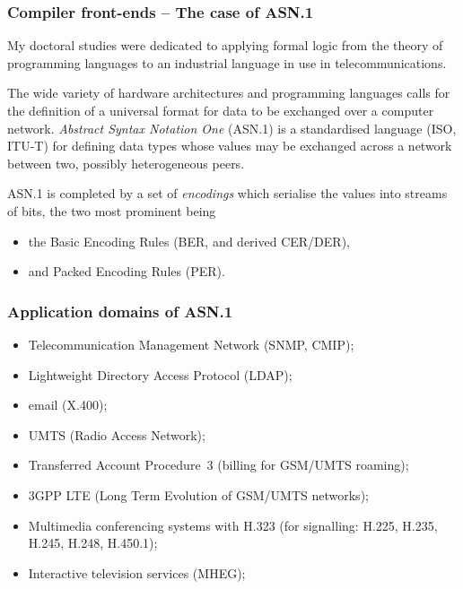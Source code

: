 \documentclass[compress,dvips,xcolor={dvipsnames},t]{beamer}
\newcommand\ASN{\textsf{ASN.1}\xspace}
\begin{document}

\begin{frame}
  \frametitle{Compiler front-ends -- The case of \ASN}

My doctoral studies were dedicated to applying formal logic from the
theory of programming languages to an industrial language in use in
telecommunications.

\medskip

The wide variety of hardware architectures and programming languages
calls for the definition of a universal format for data to be
exchanged over a computer network. \emph{Abstract Syntax Notation One}
(\ASN) is a standardised language (ISO, ITU-T) for defining data types
whose values may be exchanged across a network between two, possibly
heterogeneous peers.

\medskip

\ASN is completed by a set of \emph{encodings} which serialise the
values into streams of bits, the two most prominent being
\begin{itemize}

  \item the Basic Encoding Rules (BER, and derived CER/DER),
  \item and Packed Encoding Rules (PER).

\end{itemize}

\end{frame}


\begin{frame}
\frametitle{Application domains of \ASN}

\begin{itemize}

  \item Telecommunication Management Network (SNMP, CMIP);

  \item Lightweight Directory Access Protocol (LDAP);

  \item email (\textsf{X.400});

  \item \textsf{UMTS} (Radio Access Network);

  \item Transferred Account Procedure~3 (billing for
    \textsf{GSM/UMTS} roaming);

  \item \textsf{3GPP LTE} (Long Term Evolution of \textsf{GSM/UMTS}
    networks);

  \item Multimedia conferencing systems with \textsf{H.323} (for
    signalling: \textsf{H.225}, \textsf{H.235}, \textsf{H.245},
    \textsf{H.248}, \textsf{H.450.1});

  \item Interactive television services (\textsf{MHEG});

\end{itemize}

\end{frame}
\end{document}
